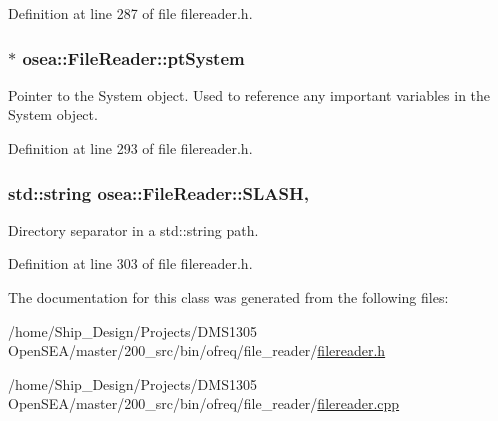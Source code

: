 Definition at line 287 of file filereader.\-h.

\hypertarget{classosea_1_1_file_reader_ae584ddecd770e251978141a152d434ac}{
\subsubsection[{pt\-System}]{$\ast$ osea\-::\-File\-Reader\-::pt\-System\hspace{0.3cm}{\ttfamily [protected]}}}\label{classosea_1_1_file_reader_ae584ddecd770e251978141a152d434ac}


Pointer to the System object. Used to reference any important variables in the System object. 



Definition at line 293 of file filereader.\-h.

\hypertarget{classosea_1_1_file_reader_ab4afa39ca9cd0b871feb788f9d865893}{
\subsubsection[{S\-L\-A\-S\-H}]{\setlength{\rightskip}{0pt plus 5cm}std\-::string osea\-::\-File\-Reader\-::\-S\-L\-A\-S\-H\hspace{0.3cm}{\ttfamily [static]}, {\ttfamily [protected]}}}\label{classosea_1_1_file_reader_ab4afa39ca9cd0b871feb788f9d865893}
Directory separator in a std\-::string path. 

Definition at line 303 of file filereader.\-h.



The documentation for this class was generated from the following files\-:\begin{DoxyCompactItemize}
\item 
/home/\-Ship\-\_\-\-Design/\-Projects/\-D\-M\-S1305 Open\-S\-E\-A/master/200\-\_\-src/bin/ofreq/file\-\_\-reader/\hyperlink{filereader_8h}{filereader.\-h}\item 
/home/\-Ship\-\_\-\-Design/\-Projects/\-D\-M\-S1305 Open\-S\-E\-A/master/200\-\_\-src/bin/ofreq/file\-\_\-reader/\hyperlink{filereader_8cpp}{filereader.\-cpp}\end{DoxyCompactItemize}
